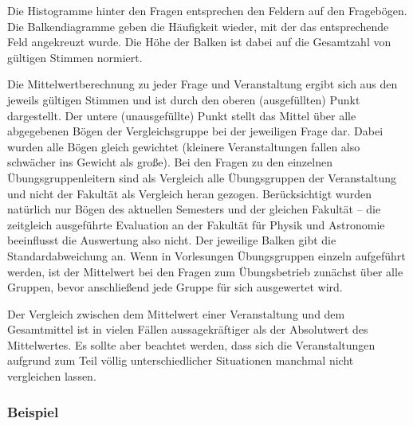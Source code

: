 Die Histogramme hinter den Fragen entsprechen den Feldern auf den Fragebögen. 
Die Balkendiagramme geben die Häufigkeit wieder, mit der das entsprechende 
Feld angekreuzt wurde. Die Höhe der Balken ist dabei auf die Gesamtzahl von 
gültigen Stimmen normiert.

Die Mittelwertberechnung zu jeder Frage und Veranstaltung ergibt sich aus den 
jeweils gültigen Stimmen und ist durch den oberen (ausgefüllten)
Punkt dargestellt. Der untere (unausgefüllte) Punkt stellt das Mittel
über alle abgegebenen Bögen der Vergleichsgruppe bei der jeweiligen Frage dar. Dabei wurden alle Bögen gleich gewichtet (kleinere Veranstaltungen
fallen also schwächer ins Gewicht als große). Bei den Fragen zu den
einzelnen Übungsgruppenleitern sind als Vergleich alle Übungsgruppen
der Veranstaltung und nicht der Fakultät als Vergleich heran gezogen. Berücksichtigt
wurden natürlich nur Bögen des aktuellen Semesters und der gleichen
Fakultät -- die zeitgleich ausgeführte Evaluation an der Fakultät
für Physik und Astronomie beeinflusst die Auswertung also
nicht. Der jeweilige Balken gibt die Standardabweichung an. 
Wenn in Vorlesungen Übungsgruppen einzeln aufgeführt werden, ist der
Mittelwert bei den Fragen zum Übungsbetrieb zunächst über alle
Gruppen, bevor anschließend jede Gruppe für sich ausgewertet wird. 

Der Vergleich zwischen dem
Mittelwert einer Veranstaltung und dem  
Gesamtmittel ist in vielen Fällen aussagekräftiger als der Absolutwert des 
Mittelwertes. Es sollte aber beachtet werden, dass sich die Veranstaltungen 
aufgrund zum Teil völlig unterschiedlicher Situationen manchmal nicht 
vergleichen lassen.

\subsubsection{Beispiel}


